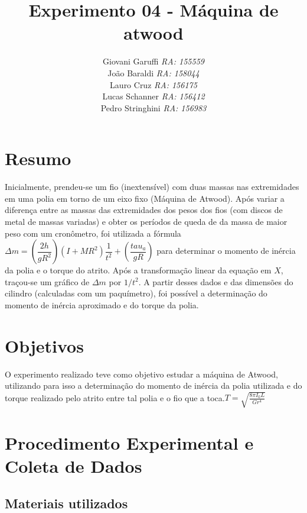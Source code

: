 \documentclass[12pt,a4paper]{article}
\begin{document}
\title{\vspace{70mm}\Huge Experimento 04 - Máquina de atwood}
\author{ Giovani Garuffi\qquad\hfill
		\textit {RA: 155559}\protect\\
		João Baraldi\hfill
		\textit{RA: 158044}\protect\\
		Lauro Cruz\hfill
		\textit{RA: 156175}\protect\\
		Lucas Schanner\hfill
		\textit{RA: 156412}\protect\\
		Pedro Stringhini\hfill
		\textit {RA: 156983}								
		}
\maketitle
\newpage
\section{Resumo}
Inicialmente, prendeu-se um fio (inextensível) com duas massas nas extremidades em uma polia em torno de um eixo fixo (Máquina de Atwood). Após variar a diferença entre as massas das extremidades dos pesos dos fios (com discos de metal de massas variadas) e obter os períodos de queda de da massa de maior peso com um cronômetro, foi utilizada a fórmula $\Delta m = (\dfrac{2h}{gR^2})(I + MR^2)\dfrac{1}{t^2}+(\dfrac{tau_a}{gR})$ para determinar o momento de inércia da polia e o torque do atrito.
Após a transformação linear da equação em $X$, traçou-se um gráfico de $\Delta m$ por $1/t^2$. A partir desses dados e das dimensões do cilindro (calculadas com um paquímetro), foi possível a determinação do momento de inércia aproximado e do torque da polia.

\section{Objetivos}
O experimento realizado teve como objetivo estudar a máquina de Atwood, utilizando para isso a determinação do momento de inércia da polia utilizada e do torque realizado pelo atrito entre tal polia e o fio que a toca.$T = \sqrt{\frac{8\pi I_0 L}{G r^4}}$


\section{Procedimento Experimental e Coleta de Dados}

\subsection{Materiais utilizados}
\end{document}
